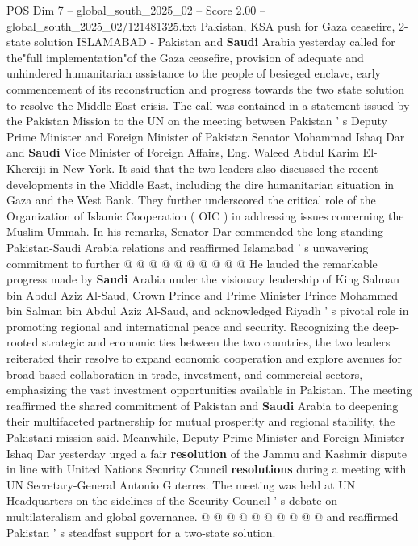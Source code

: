 \begin{textsample}{POS Dim 7 – global\_south\_2025\_02 – Score 2.00 – global\_south\_2025\_02/121481325.txt}  \label{ex:f7_pos_181}
Pakistan, KSA push for Gaza ceasefire, 2-state solution ISLAMABAD - Pakistan and \textbf{Saudi} Arabia yesterday called for the"full implementation"of the Gaza ceasefire, provision of adequate and unhindered humanitarian assistance to the people of besieged enclave, early commencement of its reconstruction and progress towards the two state solution to resolve the Middle East crisis.
The call was contained in a statement issued by the Pakistan Mission to the UN on the meeting between Pakistan ' s Deputy Prime Minister and Foreign Minister of Pakistan Senator Mohammad Ishaq Dar and \textbf{Saudi} Vice Minister of Foreign Affairs, Eng.
Waleed Abdul Karim El-Khereiji in New York.
It said that the two leaders also discussed the recent developments in the Middle East, including the dire humanitarian situation in Gaza and the West Bank.
They further underscored the critical role of the Organization of Islamic Cooperation ( OIC ) in addressing issues concerning the Muslim Ummah.
In his remarks, Senator Dar commended the long-standing Pakistan-Saudi Arabia relations and reaffirmed Islamabad ' s unwavering commitment to further @ @ @ @ @ @ @ @ @ @ He lauded the remarkable progress made by \textbf{Saudi} Arabia under the visionary leadership of King Salman bin Abdul Aziz Al-Saud, Crown Prince and Prime Minister Prince Mohammed bin Salman bin Abdul Aziz Al-Saud, and acknowledged Riyadh ' s pivotal role in promoting regional and international peace and security.
Recognizing the deep-rooted strategic and economic ties between the two countries, the two leaders reiterated their resolve to expand economic cooperation and explore avenues for broad-based collaboration in trade, investment, and commercial sectors, emphasizing the vast investment opportunities available in Pakistan.
The meeting reaffirmed the shared commitment of Pakistan and \textbf{Saudi} Arabia to deepening their multifaceted partnership for mutual prosperity and regional stability, the Pakistani mission said.
Meanwhile, Deputy Prime Minister and Foreign Minister Ishaq Dar yesterday urged a fair \textbf{resolution} of the Jammu and Kashmir dispute in line with United Nations Security Council \textbf{resolutions} during a meeting with UN Secretary-General Antonio Guterres.
The meeting was held at UN Headquarters on the sidelines of the Security Council ' s debate on multilateralism and global governance. @ @ @ @ @ @ @ @ @ @ and reaffirmed Pakistan ' s steadfast support for a two-state solution.

\end{textsample}
